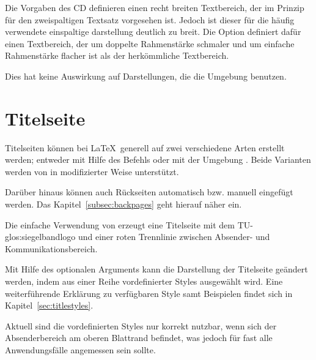 \begin{Declaration}
\end{Declaration}%

Die Vorgaben des CD definieren einen recht breiten Textbereich, der im Prinzip
für den zweispaltigen Textsatz vorgesehen ist. Jedoch ist dieser für die häufig
verwendete einspaltige darstellung deutlich zu breit.
Die Option  definiert dafür einen Textbereich, der um
doppelte Rahmenstärke schmaler und um einfache Rahmenstärke flacher
ist als der herkömmliche Textbereich.
\begin{important}
Dies hat keine Auswirkung auf Darstellungen, die die Umgebung
 benutzen.
\end{important}

\section{Titelseite}\label{sec:titlepage}

Titelseiten können bei \LaTeX\ generell auf zwei verschiedene Arten erstellt
werden; entweder mit Hilfe des Befehls  oder mit
der Umgebung . Beide Varianten werden von \tubslatex
in modifizierter Weise unterstützt.

Darüber hinaus können auch Rückseiten automatisch bzw. manuell eingefügt
werden. Das Kapitel~\ref{subsec:backpages} geht hierauf näher ein.

\begin{Declaration}
\end{Declaration}

Die einfache Verwendung von  erzeugt eine Titelseite
mit dem TU-\gls{glos:siegelbandlogo} und einer roten Trennlinie zwischen Absender- und
Kommunikationsbereich.

Mit Hilfe des optionalen Arguments  kann die Darstellung
der Titelseite geändert werden, indem aus einer Reihe vordefinierter Styles
ausgewählt wird. Eine weiterführende Erklärung zu verfügbaren Style samt
Beispielen findet sich in Kapitel~\ref{sec:titlestyles}.\bigskip

\begin{hint}
  Aktuell sind die vordefinierten Styles nur korrekt nutzbar, wenn sich der
  Absenderbereich am oberen Blattrand befindet, was jedoch für fast alle
  Anwendungsfälle angemessen sein sollte.
\end{hint}


